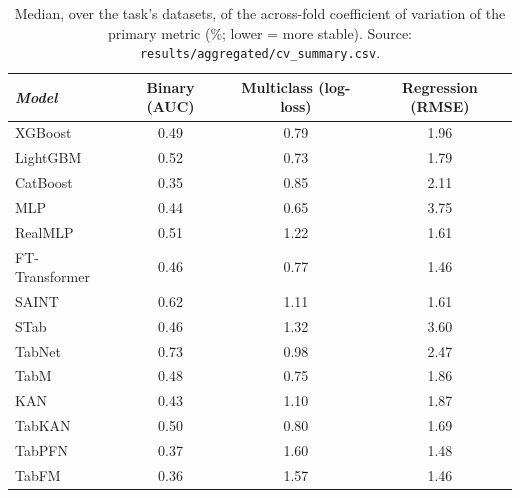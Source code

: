 \begin{table}[htbp]
\centering
\small
\caption[Across-fold variability]{Median, over the task's datasets, of the across-fold coefficient of variation of the primary metric (\%; lower = more stable). Source: \texttt{results/\allowbreak aggregated/\allowbreak cv\_\allowbreak summary.\allowbreak csv}.}
\label{tab:app-foldvar}
\begin{tabular}{lccc}
\toprule
\emph{Model} & Binary (AUC) & Multiclass (log-loss) & Regression (RMSE) \\
\midrule
XGBoost & 0.49 & 0.79 & 1.96 \\
LightGBM & 0.52 & 0.73 & 1.79 \\
CatBoost & 0.35 & 0.85 & 2.11 \\
MLP & 0.44 & 0.65 & 3.75 \\
RealMLP & 0.51 & 1.22 & 1.61 \\
FT-Transformer & 0.46 & 0.77 & 1.46 \\
SAINT & 0.62 & 1.11 & 1.61 \\
STab & 0.46 & 1.32 & 3.60 \\
TabNet & 0.73 & 0.98 & 2.47 \\
TabM & 0.48 & 0.75 & 1.86 \\
KAN & 0.43 & 1.10 & 1.87 \\
TabKAN & 0.50 & 0.80 & 1.69 \\
TabPFN & 0.37 & 1.60 & 1.48 \\
TabFM & 0.36 & 1.57 & 1.46 \\
\bottomrule
\end{tabular}
\end{table}
